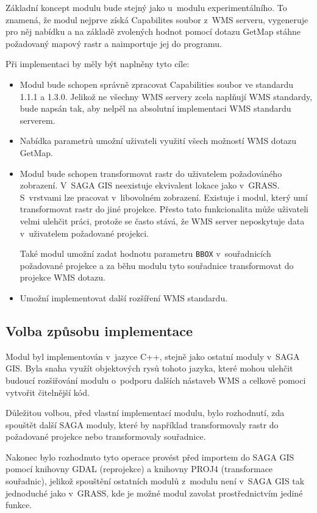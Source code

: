 \documentclass[a4paper,12pt]{article}
\begin{document}
Základní koncept modulu bude stejný jako u~modulu experimentálního. To
znamená, že modul nejprve získá Capabilites soubor z~WMS serveru,
vygeneruje pro něj nabídku a na základě zvolených hodnot pomocí dotazu
GetMap stáhne požadovaný mapový rastr a naimportuje jej do programu.

Při implementaci by měly být naplněny tyto cíle:
\begin{itemize}
\item Modul bude schopen správně zpracovat Capabilities soubor
  ve standardu 1.1.1 a 1.3.0.  Jelikož ne všechny WMS servery zcela
  naplňují WMS standardy, bude napsán tak, aby nelpěl na absolutní 
  implementaci WMS standardu serverem.
\item Nabídka parametrů umožní uživateli využití všech možností WMS
  dotazu GetMap.
\item Modul bude schopen transformovat rastr do uživatelem
  požadováného zobrazení. V~SAGA GIS neexistuje ekvivalent lokace jako
  v~GRASS. S~vrstvami lze pracovat v~libovolném zobrazení. 
  Existuje i modul, který umí transformovat rastr do jiné
  projekce. Přesto tato funkcionalita může uživateli velmi ulehčit práci,    
  protože se často stává, že WMS server neposkytuje data
v~uživatelem požadované  projekci.  
  
  Také modul umožní zadat hodnotu parametru {\tt BBOX}
v~souřadnicích požadované projekce a za běhu modulu tyto souřadnice
  transformovat do projekce WMS dotazu.
\item Umožní implementovat další rozšíření WMS standardu.
\end{itemize}


\subsection{Volba způsobu implementace}

Modul byl implementován v~jazyce C++, stejně jako ostatní moduly v~SAGA GIS. 
Byla snaha využít objektových rysů tohoto jazyka, které mohou ulehčit 
budoucí rozšiřování modulu o~podporu dalších nástaveb WMS a celkově 
pomoci vytvořit čitelnější kód.

Důležitou volbou, před vlastní implementací modulu, bylo
rozhodnutí, zda spouštět další SAGA moduly, které by
například transformovaly rastr do požadované projekce nebo
transformovaly souřadnice.

Nakonec bylo rozhodnuto tyto operace provést před importem do SAGA GIS
pomocí knihovny GDAL (reprojekce) a knihovny PROJ4 (transformace
souřadnic), jelikož spouštění ostatních modulů z~modulu není v~SAGA
GIS tak jednoduché jako v~GRASS, kde je možné modul zavolat
prostřednictvím jediné funkce. 
\end{document}
